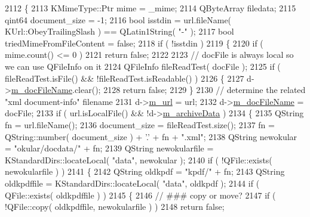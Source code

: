 \begin{DoxyCode}
2112 \{
2113     KMimeType::Ptr mime = \_mime;
2114     QByteArray filedata;
2115     qint64 document\_size = -1;
2116     \textcolor{keywordtype}{bool} isstdin = url.fileName( KUrl::ObeyTrailingSlash ) == QLatin1String( \textcolor{stringliteral}{"-"} );
2117     \textcolor{keywordtype}{bool} triedMimeFromFileContent = \textcolor{keyword}{false};
2118     \textcolor{keywordflow}{if} ( !isstdin )
2119     \{
2120         \textcolor{keywordflow}{if} ( mime.count() <= 0 )
2121             \textcolor{keywordflow}{return} \textcolor{keyword}{false};
2122 
2123         \textcolor{comment}{// docFile is always local so we can use QFileInfo on it}
2124         QFileInfo fileReadTest( docFile );
2125         \textcolor{keywordflow}{if} ( fileReadTest.isFile() && !fileReadTest.isReadable() )
2126         \{
2127             d->\hyperlink{classOkular_1_1DocumentPrivate_af56dcee87c3465c69da7cea920b95fbb}{m\_docFileName}.clear();
2128             \textcolor{keywordflow}{return} \textcolor{keyword}{false};
2129         \}
2130         \textcolor{comment}{// determine the related "xml document-info" filename}
2131         d->\hyperlink{classOkular_1_1DocumentPrivate_a1a0145bbb16d15c016000a83d0d2ab2b}{m\_url} = url;
2132         d->\hyperlink{classOkular_1_1DocumentPrivate_af56dcee87c3465c69da7cea920b95fbb}{m\_docFileName} = docFile;
2133         \textcolor{keywordflow}{if} ( url.isLocalFile() && !d->\hyperlink{classOkular_1_1DocumentPrivate_a135bb6fa2886b0eb86e9a1b72fd8d25b}{m\_archiveData} )
2134         \{
2135             QString fn = url.fileName();
2136             document\_size = fileReadTest.size();
2137             fn = QString::number( document\_size ) + \textcolor{charliteral}{'.'} + fn + \textcolor{stringliteral}{".xml"};
2138             QString newokular = \textcolor{stringliteral}{"okular/docdata/"} + fn;
2139             QString newokularfile = KStandardDirs::locateLocal( \textcolor{stringliteral}{"data"}, newokular );
2140             \textcolor{keywordflow}{if} ( !QFile::exists( newokularfile ) )
2141             \{
2142                 QString oldkpdf = \textcolor{stringliteral}{"kpdf/"} + fn;
2143                 QString oldkpdffile = KStandardDirs::locateLocal( \textcolor{stringliteral}{"data"}, oldkpdf );
2144                 \textcolor{keywordflow}{if} ( QFile::exists( oldkpdffile ) )
2145                 \{
2146                     \textcolor{comment}{// ### copy or move?}
2147                     \textcolor{keywordflow}{if} ( !QFile::copy( oldkpdffile, newokularfile ) )
2148                         \textcolor{keywordflow}{return} \textcolor{keyword}{false};

\end{DoxyCode}
